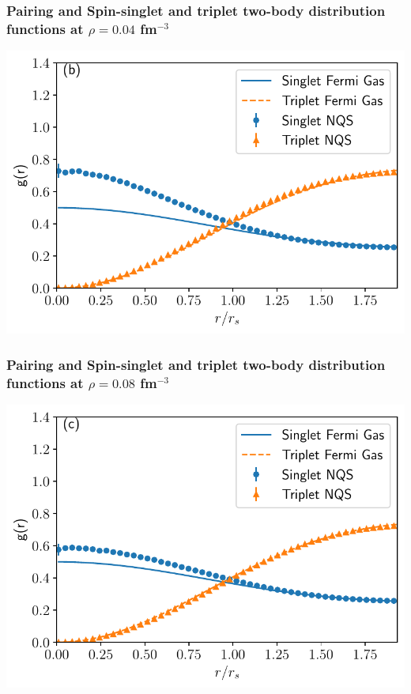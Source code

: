 \documentclass[11pt]{beamer} %
\begin{document}
\begin{frame}
\frametitle{Pairing and Spin-singlet and triplet two-body distribution functions at $\rho=0.04$ fm$^{-3}$}


\vspace{6mm}

\centerline{\includegraphics[width=0.8\linewidth]{figures/04_tbd.pdf}}

\vspace{6mm}

\end{frame}

\begin{frame}
\frametitle{Pairing and Spin-singlet and triplet two-body distribution functions at $\rho=0.08$ fm$^{-3}$}


\vspace{6mm}

\centerline{\includegraphics[width=0.8\linewidth]{figures/08_tbd.pdf}}

\vspace{6mm}

\end{frame}
\end{document}
